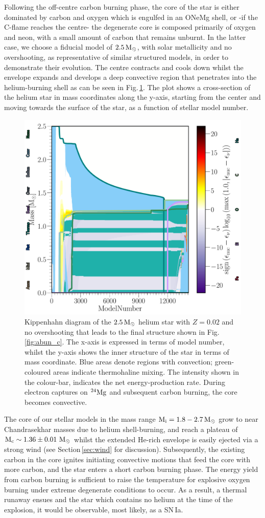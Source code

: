 \documentclass[../../main/thesis_msc.tex]{subfiles}
\begin{document}
    Following the off-centre carbon burning phase, the core of the star is either dominated by carbon and oxygen which is engulfed in an ONeMg shell, or -if the C-flame reaches the centre- the degenerate core is composed primarily of oxygen and neon, with a small amount of carbon that remains unburnt. In the latter case, we choose a fiducial model of $\rm 2.5\, M_{\odot}$, with solar metallicity and no overshooting, as representative of similar structured models, in order to demonstrate their evolution. The centre contracts and cools down whilst the envelope expands and develops a deep convective region that penetrates into the helium-burning shell as can be seen in Fig.\,\ref{fig:Kipp}. The plot shows a cross-section of the helium star in mass coordinates along the y-axis, starting from the center and moving towards the surface of the star, as a function of stellar model number.
    
    
    
    \begin{figure}[t]
        \centering
        \includegraphics[width=0.5\columnwidth]{../figures/chapter4/Kipp_2p5_0p02_0p0.pdf}
        \caption{Kippenhahn diagram of the $\rm 2.5\, M_{\odot}$ helium star with $Z = 0.02$ and no overshooting that leads to the final structure shown in Fig.\,\ref{fig:abun_c}. The x-axis is expressed in terms of model number, whilst the y-axis shows the inner structure of the star in terms of mass coordinate. Blue areas denote regions with convection; green-coloured areas indicate thermohaline mixing. The intensity shown in the colour-bar, indicates the net energy-production rate. During electron captures on $\rm ^{24}Mg$ and subsequent carbon burning, the core becomes convective.}
        \label{fig:Kipp}
    \end{figure}
    
    
    The core of our stellar models in the mass range $\rm M_i = 1.8 - 2.7\, M_{\odot}$ grow to near Chandrasekhar masses due to helium shell-burning, and reach a plateau of $\rm M_c \sim 1.36 \pm 0.01 \ M_{\odot}$ whilst the extended He-rich envelope is easily ejected via a strong wind (see Section\,\ref{sec:wind} for discussion).
    Subsequently, the existing carbon in the core ignites initiating convective motions that feed the core with more carbon, and the star enters a short carbon burning phase. The energy yield from carbon burning is sufficient to raise the temperature for explosive oxygen burning under extreme degenerate conditions to occur. As a result, a thermal runaway ensues and the star which contains no helium at the time of the explosion, it would be observable, most likely, as a SN\,Ia.
    
\end{document}
